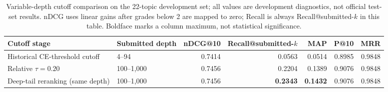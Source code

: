 \begin{table}[tb]
\centering
\caption{Variable-depth cutoff comparison on the 22-topic development
set; all values are development diagnostics, not official test-set
results. nDCG uses linear gains after grades below 2 are mapped to zero;
Recall is always Recall@submitted-$k$
in this table. Boldface marks a column maximum, not statistical
significance.}
\label{tab:retrieval-cutoff}
\small
\setlength{\tabcolsep}{6pt}
\renewcommand{\arraystretch}{1.12}
\begin{tabular}{@{}l l r r r r r@{}}
\toprule
Cutoff stage & Submitted depth & nDCG@10 & Recall@submitted-$k$ & MAP & P@10 & MRR \\
\midrule
Historical CE-threshold cutoff & 4--94 & 0.7414 & 0.0563 & 0.0514 & 0.8985 & 0.9848 \\
Relative $\tau=0.20$ & 100--1,000 & 0.7456 & 0.2204 & 0.1389 & 0.9076 & 0.9848 \\
Deep-tail reranking (same depth) & 100--1,000 & 0.7456 & \textbf{0.2343} & \textbf{0.1432} & 0.9076 & 0.9848 \\
\bottomrule
\end{tabular}
\end{table}
